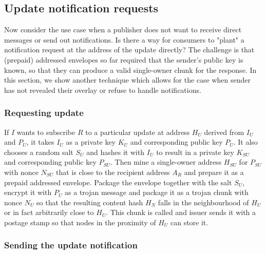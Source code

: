 
\subsection{Update notification requests\statusgreen}\label{sec:update-notification-requests} 

Now consider the use case when a publisher does not want to receive direct messages or send out notifications. Is there a way for consumers to "plant" a notification request at the address of the update directly? The challenge is that (prepaid) addressed envelopes so far required that the sender's public key is known, so that they can produce a valid single-owner chunk for the response. In this section, we show another technique which allows for the case when sender has not revealed their overlay or refuse to handle notifications.                                                                                                                                                                                                                               
\subsubsection{Requesting update} 

If $I$  wants to subscribe $R$ to a  particular update at address $H_U$ derived from $I_U$ and $P_U$, it takes $I_U$ as a private key $K_U$ and corresponding public key $P_U$. It also chooses a random salt $S_U$ and hashes it with $I_U$ to result in a private key $K_{SU}$ and corresponding public key $P_{SU}$. Then mine a single-owner address $H_{SU}$ for $P_{SU}$ with nonce $N_{SU}$ that is close to the recipient address $A_R$ and prepare it as a prepaid addressed envelope. Package the envelope together with the salt $S_U$, encrypt it with $P_U$ as a trojan message and
package it as a trojan chunk with nonce $N_U$ so that the resulting content hash $H_N$ falls in the neighbourhood of $H_U$ or in fact arbitrarily close to $H_U$. This chunk is called  and issuer sends it with a postage stamp so that nodes in the proximity of $H_U$ can store it.


\subsubsection{Sending the update notification}

